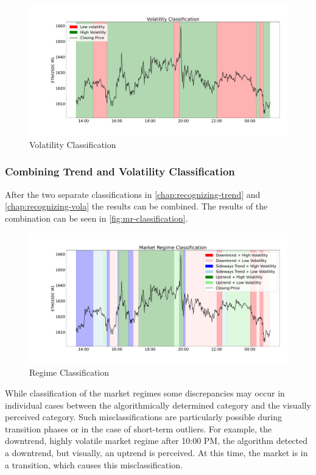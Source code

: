 \begin{figure}[H]
    \centering
    \includegraphics[width=\textwidth]{images/market-regime/market_regime_vola}
    \caption{Volatility Classification}
    \label{fig:mr-vola-classification}
\end{figure}

\subsubsection{Combining Trend and Volatility Classification}

After the two separate classifications in \autoref{chap:recognizing-trend} and \autoref{chap:recognizing-vola} the results can be combined.
The results of the combination can be seen in \autoref{fig:mr-classification}.

\begin{figure}[H]
    \centering
    \includegraphics[width=\textwidth]{images/market-regime/market_regime}
    \caption{Regime Classification}
    \label{fig:mr-classification}
\end{figure}

While classification of the market regimes some discrepancies may occur in individual cases between the algorithmically determined category and the visually perceived category.
Such misclassifications are particularly possible during transition phases or in the case of short-term outliers.
For example, the downtrend, highly volatile market regime after 10:00 PM, the algorithm detected a downtrend, but visually, an uptrend is perceived.
At this time, the market is in a transition, which causes this misclassification.

